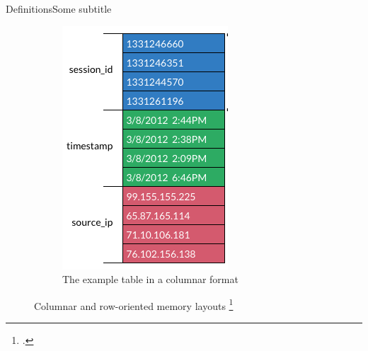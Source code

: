 \begin{frame}[t]{Definitions}{Some subtitle}
\begin{description}
\begin{figure}
\begin{subfigure}{0.22\linewidth}
				      \includegraphics[height=0.3\FrameHeight]{assets/table-columnar.png}
				      \caption{The example table in a columnar format}
			      \end{subfigure}
			      \caption{Columnar and row-oriented memory layouts \footcite{arrow:overview}}
		      \end{figure}
	\end{description}
\end{frame}
